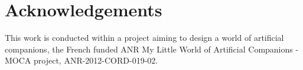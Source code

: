 \documentclass[a4paper,twocolumn]{svjour3}
\begin{document}




\section{Acknowledgements}
This work is conducted within a project aiming to design a world of artificial companions, the French funded ANR My Little World of Artificial Companions - MOCA project, ANR-2012-CORD-019-02.

\small


\end{document}
